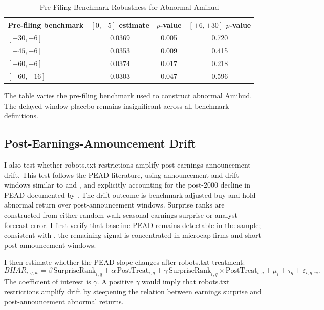 \begin{table}[!htbp]
\centering
\caption{Pre-Filing Benchmark Robustness for Abnormal Amihud}
\label{tab:amihud_benchmark_robustness}
\begin{threeparttable}
\begin{tabular}{lccc}
\toprule
Pre-filing benchmark & \([0,+5]\) estimate & \(p\)-value & \([+6,+30]\) \(p\)-value \\
\midrule
\([-30,-6]\)  & 0.0369 & 0.005 & 0.720 \\
\([-45,-6]\)  & 0.0353 & 0.009 & 0.415 \\
\([-60,-6]\)  & 0.0374 & 0.017 & 0.218 \\
\([-60,-16]\) & 0.0303 & 0.047 & 0.596 \\
\bottomrule
\end{tabular}
\begin{tablenotes}[flushleft]\footnotesize
\item The table varies the pre-filing benchmark used to construct abnormal
Amihud.  The delayed-window placebo remains insignificant across all
benchmark definitions.
\end{tablenotes}
\end{threeparttable}
\end{table}

\subsection{Post-Earnings-Announcement Drift}
\label{subsec:robots_pead}

I also test whether robots.txt restrictions amplify
post-earnings-announcement drift.  This test follows the PEAD literature,
using announcement and drift windows similar to \citet{DellaVignaPollet2009}
and \citet{HirshleiferLimTeoh2009}, and explicitly accounting for the
post-2000 decline in PEAD documented by \citet{Martineau2021}.  The drift
outcome is benchmark-adjusted buy-and-hold abnormal return over
post-announcement windows.  Surprise ranks are constructed from either
random-walk seasonal earnings surprise or analyst forecast error.  I first
verify that baseline PEAD remains detectable in the sample; consistent
with \citet{Martineau2021}, the remaining signal is concentrated in
microcap firms and short post-announcement windows.

I then estimate whether the PEAD slope changes after robots.txt treatment:
\[
    BHAR_{i,q,w}
    =
    \beta\,\text{SurpriseRank}_{i,q}
    +
    \alpha\,\text{PostTreat}_{i,q}
    +
    \gamma\,
    \text{SurpriseRank}_{i,q}\times \text{PostTreat}_{i,q}
    +
    \mu_i+\tau_q+\varepsilon_{i,q,w}.
\]
The coefficient of interest is \(\gamma\).  A positive \(\gamma\) would
imply that robots.txt restrictions amplify drift by steepening the
relation between earnings surprise and post-announcement abnormal returns.

